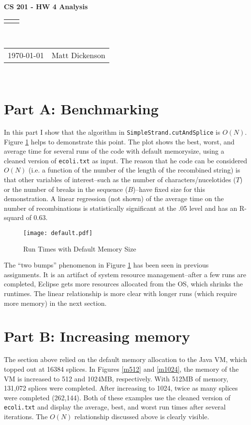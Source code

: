 \documentclass[12pt]{article}
\renewcommand{\title}[1]{\textbf{#1}\\}
\renewcommand{\line}{\begin{tabularx}{\textwidth}{X>{\raggedleft}X}\hline\\\end{tabularx}\\[-0.5cm]}
\newcommand{\leftright}[2]{\begin{tabularx}{\textwidth}{X>{\raggedleft}X}#1%
& #2\\\end{tabularx}\\[-0.5cm]}
\begin{document}
\title{CS 201 - HW 4 Analysis}
\line
\leftright{\today}{Matt Dickenson} %
\setlength{\parindent}{16pt}

\section*{Part A: Benchmarking}

In this part I show that the algorithm in \texttt{SimpleStrand.cutAndSplice} is $O(N)$. Figure \ref{default} helps to demonstrate this point. The plot shows the best, worst, and average time for several runs of the code with default memorysize, using a cleaned version of \texttt{ecoli.txt} as input. The reason that he code can be considered $O(N)$ (i.e. a function of the number of the length of the recombined string) is that other variables of interest--such as the number of characters/nucelotides ($T$) or the number of breaks in the sequence ($B$)--have fixed size for this demonstration. A linear regression (not shown) of the average time on the number of recombinations is statistically significant at the .05 level and has an R-squard of 0.63. 

\begin{center}
\begin{figure}[h!]
\centering
\texttt{[image: default.pdf]}
\caption{Run Times with Default Memory Size}
\label{default}
\end{figure}
\end{center}

The ``two bumps'' phenomenon in Figure \ref{default} has been seen in previous assignments. It is an artifact of system resource management--after a few runs are completed, Eclipse gets more resources allocated from the OS, which shrinks the runtimes. The linear relationship is more clear with longer runs (which require more memory) in the next section. 

\section*{Part B: Increasing memory}

The section above relied on the default memory allocation to the Java VM, which topped out at 16384 splices. In Figures \ref{m512} and \ref{m1024}, the memory of the VM is increased to 512 and 1024MB, respectively. With 512MB of memory, 131,072 splices were completed. After increasing to 1024, twice as many splices were completed (262,144). Both of these examples use the cleaned version of \texttt{ecoli.txt} and display the average, best, and worst run times after several iterations. The $O(N)$ relationship discussed above is clearly visible. 
\end{document}
